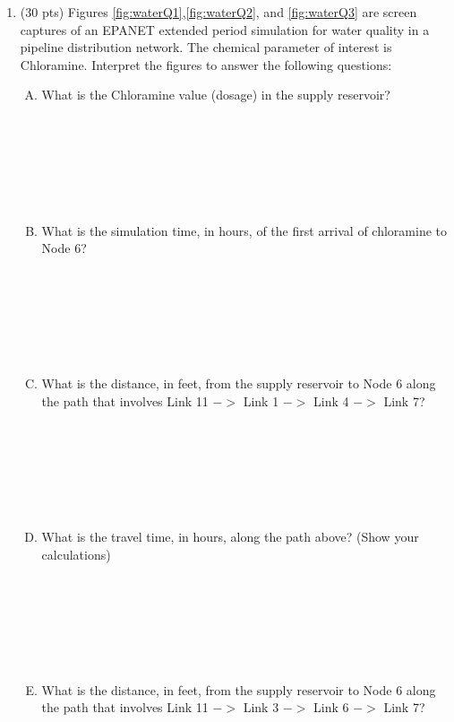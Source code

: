 \documentclass[11pt]{article}
\begin{document}
\begin{enumerate}
\item (30 pts) Figures \ref{fig:waterQ1},\ref{fig:waterQ2}, and \ref{fig:waterQ3} are screen captures of an EPANET extended period simulation for water quality in a pipeline distribution network.
The chemical parameter of interest is Chloramine.  Interpret the figures to answer the following questions: ~\\
\begin{enumerate}[A)]
\item What is the Chloramine value (dosage) in the supply reservoir? \\~\\~\\~\\~\\~\\~\\
\item What is the simulation time, in hours, of the first arrival of chloramine to Node 6? \\~\\~\\~\\~\\~\\~\\
\item What is the distance, in feet, from the supply reservoir to Node 6 along the path that involves Link 11 $->$ Link 1 $->$ Link 4 $->$ Link 7? \\~\\~\\~\\~\\~\\~\\
\item What is the travel time, in hours, along the path above? (Show your calculations) \\~\\~\\~\\~\\~\\~\\
\newpage
\item What is the distance, in feet, from the supply reservoir to Node 6 along the path that involves Link 11 $->$ Link 3 $->$ Link 6 $->$ Link 7? \\~\\~\\~\\~\\~\\~\\

\end{enumerate}
\end{enumerate}
\end{document}
